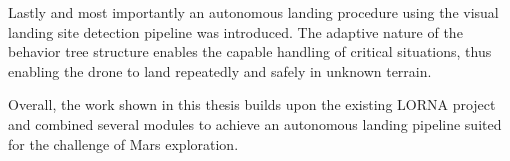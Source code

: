 Lastly and most importantly an autonomous landing procedure using the visual landing site detection pipeline was introduced.  The adaptive nature of the behavior tree structure enables the capable handling of critical situations, thus enabling the drone to land repeatedly and safely in unknown terrain.

Overall, the work shown in this thesis builds upon the existing LORNA project and combined several modules to achieve an autonomous landing pipeline suited for the challenge of Mars exploration. 